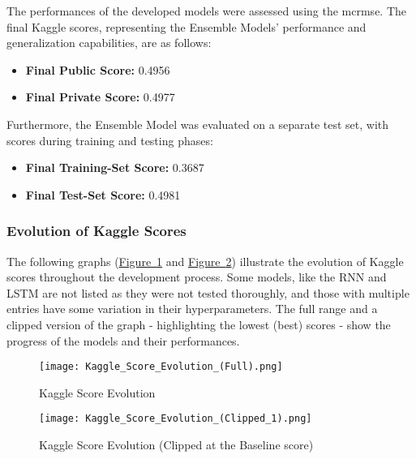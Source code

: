 The performances of the developed models were assessed using the \gls{mcrmse}. The final Kaggle scores, representing the Ensemble Models' performance and generalization capabilities, are as follows:

\begin{itemize}
    \item \textbf{Final Public Score:} 0.4956
    \item \textbf{Final Private Score:} 0.4977
\end{itemize}
Furthermore, the Ensemble Model was evaluated on a separate test set, with scores during training and testing phases:

\begin{itemize}
    \item \textbf{Final Training-Set Score:} 0.3687
    \item \textbf{Final Test-Set Score:} 0.4981
\end{itemize}

\subsubsection{Evolution of Kaggle Scores}

The following graphs
(\hyperref[fig:kaggle-score-evolution]{Figure~\ref{fig:kaggle-score-evolution}}
and
\hyperref[fig:kaggle-score-evolution_clipped]{Figure~\ref{fig:kaggle-score-evolution_clipped}})
illustrate the evolution of Kaggle scores throughout the development process. Some models, like the RNN and LSTM are not listed as they were not tested thoroughly, and those with multiple entries have some variation in their hyperparameters. The full range and a clipped version of the graph - highlighting the lowest (best) scores - show the progress of the models and their performances.

\begin{figure}[H]
\texttt{[image: Kaggle\_Score\_Evolution\_(Full).png]}
\caption{Kaggle Score Evolution}
\label{fig:kaggle-score-evolution}
\end{figure}
\begin{figure}[H]
\texttt{[image: Kaggle\_Score\_Evolution\_(Clipped\_1).png]}
\caption{Kaggle Score Evolution (Clipped at the Baseline score)}
\label{fig:kaggle-score-evolution_clipped}
\end{figure}
